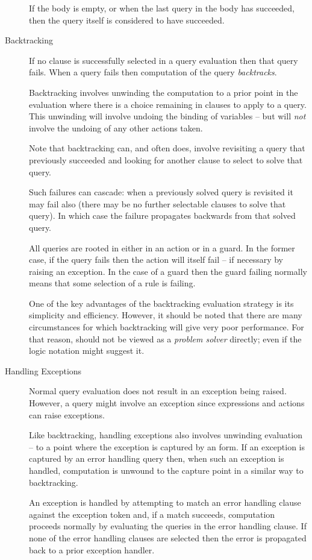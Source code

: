 \begin{description}
If the body is empty, or when the last query in the body has succeeded, then the query itself is considered to have succeeded.

\item[Backtracking]
If no clause is successfully selected in a query evaluation then that query fails. When a query fails then computation of the query \emph{backtracks}.

Backtracking involves unwinding the computation to a prior point in the evaluation where there is a choice remaining in clauses to apply to a query. This unwinding will involve undoing the binding of variables -- but will \emph{not} involve the undoing of any other actions taken.

Note that backtracking can, and often does, involve revisiting a query that previously succeeded and looking for another clause to select to solve that query. 

Such failures can cascade: when a previously solved query is revisited it may fail also (there may be no further selectable clauses to solve that query). In which case the failure propagates backwards from that solved query.

All queries are rooted in either in an action or in a guard. In the former case, if the query fails then the action will itself fail -- if necessary by raising an exception. In the case of a guard then the guard failing normally means that some selection of a rule is failing.

One of the key advantages of the backtracking evaluation strategy is its simplicity and efficiency. However, it should be noted that there are many circumstances for which backtracking will give very poor performance. For that reason, \go should not be viewed as a \emph{problem solver}
directly; even if the logic notation might suggest it.

\item[Handling Exceptions]
Normal query evaluation does not result in an exception being raised. However, a query might involve an exception since expressions and actions can raise exceptions.

Like backtracking, handling exceptions also involves unwinding evaluation -- to a point where the exception is captured by an  form. If an exception is captured by an error handling query then, when such an exception is handled, computation is unwound to the capture point in a similar way to backtracking. 

An exception is handled by attempting to match an error handling clause against the exception token and, if a match succeeds, computation proceeds normally by evaluating the queries in the error handling clause. If none of the error handling clauses are selected then the error is propagated back to a prior exception handler.
\end{description}


